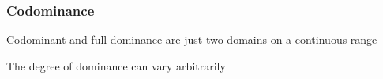 \documentclass{beamer}
\begin{document}
\begin{frame}
	\frametitle{Codominance}

Codominant and full dominance are just two domains on a continuous range

\bigskip

The degree of dominance can vary arbitrarily


		\begin{block}


	\end{block}


\end{frame}


\end{document}

